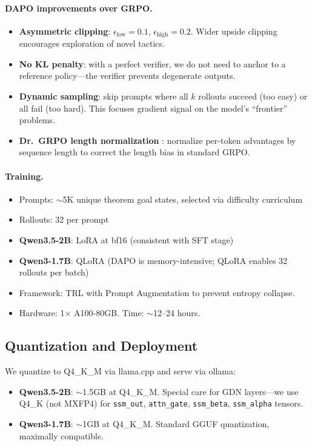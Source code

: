 \documentclass[11pt,a4paper]{article}
\begin{document}
\paragraph{DAPO improvements over GRPO.}
\begin{itemize}
\item \textbf{Asymmetric clipping}: $\epsilon_{\text{low}} = 0.1$, $\epsilon_{\text{high}} = 0.2$. Wider upside clipping encourages exploration of novel tactics.
\item \textbf{No KL penalty}: with a perfect verifier, we do not need to anchor to a reference policy---the verifier prevents degenerate outputs.
\item \textbf{Dynamic sampling}: skip prompts where all $k$ rollouts succeed (too easy) or all fail (too hard). This focuses gradient signal on the model's ``frontier'' problems.
\item \textbf{Dr.\ GRPO length normalization} \citep{drgrpo}: normalize per-token advantages by sequence length to correct the length bias in standard GRPO.
\end{itemize}

\paragraph{Training.}
\begin{itemize}
\item Prompts: $\sim$5K unique theorem goal states, selected via difficulty curriculum
\item Rollouts: 32 per prompt
\item \textbf{Qwen3.5-2B}: LoRA at bf16 (consistent with SFT stage)
\item \textbf{Qwen3-1.7B}: QLoRA (DAPO is memory-intensive; QLoRA enables 32 rollouts per batch)
\item Framework: TRL \citep{trl} with Prompt Augmentation \citep{promptauggrpo} to prevent entropy collapse.
\item Hardware: 1$\times$ A100-80GB. Time: $\sim$12--24 hours.
\end{itemize}

\subsection{Quantization and Deployment}
\label{sec:deploy}

We quantize to Q4\_K\_M via llama.cpp and serve via ollama:

\begin{itemize}
\item \textbf{Qwen3.5-2B}: $\sim$1.5GB at Q4\_K\_M. Special care for GDN layers---we use Q4\_K (not MXFP4) for \texttt{ssm\_out}, \texttt{attn\_gate}, \texttt{ssm\_beta}, \texttt{ssm\_alpha} tensors.
\item \textbf{Qwen3-1.7B}: $\sim$1GB at Q4\_K\_M. Standard GGUF quantization, maximally compatible.
\end{itemize}
\end{document}
